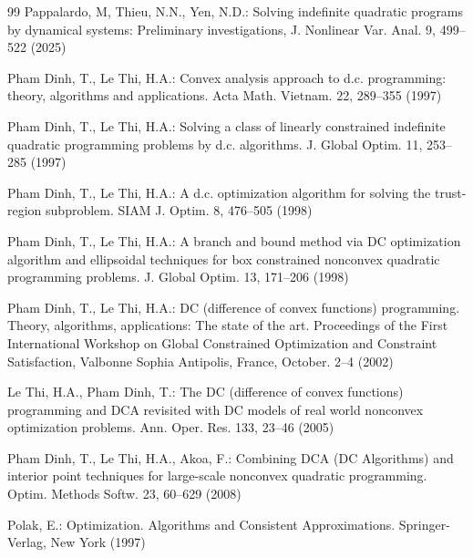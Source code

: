 \documentclass[11pt]{article}
\theoremstyle{definition}
\theoremstyle{remark}
\begin{document}
\begin{thebibliography}{99}
	 Pappalardo, M, Thieu,  N.N., Yen, N.D.: Solving indefinite quadratic programs by dynamical systems: Preliminary investigations, J. Nonlinear Var. Anal. 9, 499--522 (2025)
		
	  Pham Dinh, T., Le Thi, H.A.:  Convex analysis approach to d.c. programming: theory, algorithms and applications. Acta Math. Vietnam. 22, 289--355 (1997)
	
	 Pham Dinh, T., Le Thi,  H.A.: Solving a class of linearly constrained indefinite quadratic programming problems by d.c. algorithms. J. Global Optim. 11, 253--285 (1997)
	
	 Pham Dinh, T., Le Thi, H.A.: A d.c. optimization algorithm for solving the trust-region subproblem. SIAM J. Optim. 8, 476--505 (1998) 
	
	  Pham Dinh, T., Le Thi, H.A.: A branch and bound method via DC optimization algorithm and ellipsoidal techniques for box constrained nonconvex quadratic programming problems. J. Global Optim. 13, 171--206 (1998)
	
	  Pham Dinh, T., Le Thi, H.A.: DC (difference of convex functions) programming. Theory, algorithms, applications: The state of the art. Proceedings of the First International Workshop on Global Constrained Optimization and Constraint Satisfaction, Valbonne Sophia Antipolis, France, October. 2--4 (2002)
	
	 Le Thi, H.A., Pham Dinh, T.: The DC (difference of convex functions) programming and DCA revisited with DC models of real world nonconvex optimization problems. Ann. Oper. Res. 133, 23--46 (2005)
	
	 Pham Dinh, T., Le Thi,  H.A., Akoa, F.: Combining DCA (DC Algorithms) and interior point techniques for large-scale nonconvex quadratic programming. Optim. Methods Softw. 23, 60--629 (2008)
	
	
	 Polak, E.: Optimization. Algorithms and Consistent Approximations. Springer-Verlag, New York (1997)
	
	
	

\end{thebibliography}
\end{document}

